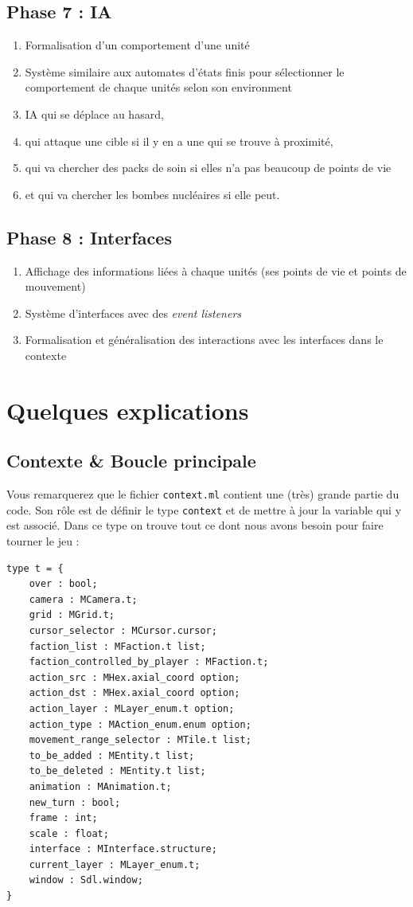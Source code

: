 \documentclass{article}
\begin{document}
\subsection*{Phase 7 : IA}
\begin{enumerate}
    \item Formalisation d'un comportement d'une unité 
    \item Système similaire aux automates d'états finis pour sélectionner le comportement de chaque unités selon son environment
    \item IA qui se déplace au hasard,
    \item qui attaque une cible si il y en a une qui se trouve à proximité,
    \item qui va chercher des packs de soin si elles n'a pas beaucoup de points de vie
    \item et qui va chercher les bombes nucléaires si elle peut.
\end{enumerate}

\subsection*{Phase 8 : Interfaces}
\begin{enumerate}
    \item Affichage des informations liées à chaque unités (ses points de vie et points de mouvement)
    \item Système d'interfaces avec des \textit{event listeners}
    \item Formalisation et généralisation des interactions avec les interfaces dans le contexte
\end{enumerate}

\section{Quelques explications}
\subsection{Contexte \& Boucle principale}
Vous remarquerez que le fichier \texttt{context.ml} contient une (très) grande partie du code. Son rôle
est de définir le type \texttt{context} et de mettre à jour la variable qui y est associé.
Dans ce type on trouve tout ce dont nous avons besoin pour faire tourner le jeu : 

\begin{verbatim}
type t = {
    over : bool; 
    camera : MCamera.t;
    grid : MGrid.t;
    cursor_selector : MCursor.cursor;
    faction_list : MFaction.t list;
    faction_controlled_by_player : MFaction.t;
    action_src : MHex.axial_coord option;
    action_dst : MHex.axial_coord option;
    action_layer : MLayer_enum.t option;
    action_type : MAction_enum.enum option;
    movement_range_selector : MTile.t list;
    to_be_added : MEntity.t list;
    to_be_deleted : MEntity.t list;
    animation : MAnimation.t;
    new_turn : bool;
    frame : int;
    scale : float;
    interface : MInterface.structure;
    current_layer : MLayer_enum.t;
    window : Sdl.window;
}
\end{verbatim}
\end{document}
